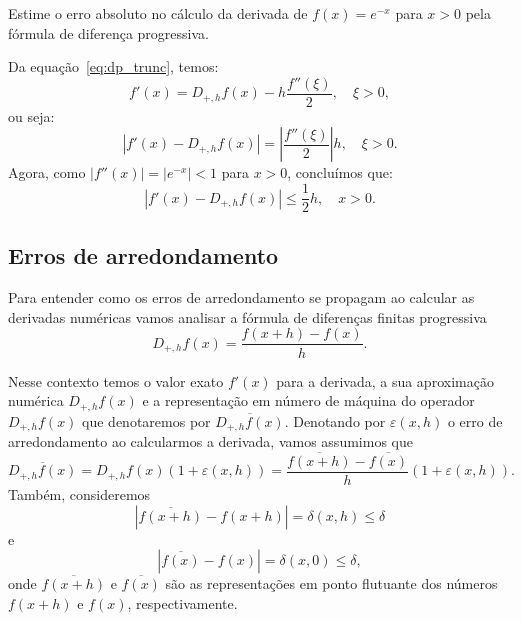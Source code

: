 \begin{ex}
Estime o erro absoluto no cálculo da derivada de $f(x)=e^{-x}$ para $x>0$ pela fórmula de diferença progressiva.
\end{ex}
\begin{sol}
Da equação~\ref{eq:dp_trunc}, temos:
\begin{equation*}
  f'(x) = D_{+,h}f(x) - h\frac{f''(\xi)}{2},\quad \xi>0,
\end{equation*}
ou seja:
\begin{equation*}
  |f'(x) - D_{+,h}f(x)| = \left|\frac{f''(\xi)}{2}\right|h,\quad \xi>0.
\end{equation*}
Agora, como $|f''(x)| = |e^{-x}| < 1$ para $x>0$, concluímos que:
\begin{equation*}
  |f'(x) - D_{+,h}f(x)| \leq \frac{1}{2}h,\quad x>0.
\end{equation*}
\end{sol}

\subsection{Erros de arredondamento}
Para entender como os erros de arredondamento se propagam ao calcular as derivadas numéricas vamos analisar a fórmula de diferenças finitas progressiva
\begin{equation*}
  D_{+,h}f(x) =\frac{f(x+h)-f(x)}{h}.  
\end{equation*}

Nesse contexto temos o valor exato $f'(x)$ para a derivada, a sua aproximação numérica $D_{+,h}f(x)$ e a representação em número de máquina do operador $D_{+,h}f(x)$ que denotaremos por $\overline{D_{+,h}f(x)}$. Denotando por $\varepsilon(x,h)$ o erro de arredondamento ao calcularmos a derivada, vamos assumimos que
\begin{equation}\label{ex:ea_dp}
\overline{D_{+,h}f(x)}=D_{+,h}f(x)(1+\varepsilon(x,h))=\frac{\overline{f(x+h)}-\overline{f(x)}}{h}(1+\varepsilon(x,h)).  
\end{equation}
Também, consideremos
\begin{equation*}
|\overline{f(x+h)}-f(x+h)|=\delta(x,h)\leq \delta  
\end{equation*}
e
\begin{equation*}
  |\overline{f(x)}-f(x)|=\delta(x,0)\leq \delta,  
\end{equation*}
onde $\overline{f(x+h)}$ e $\overline{f(x)}$ são as representações em ponto flutuante dos números $f(x+h)$ e $f(x)$, respectivamente. 

